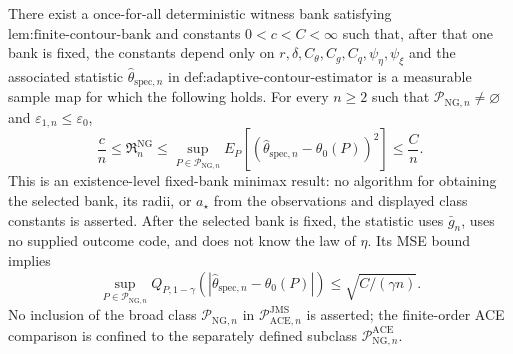 There exist a once-for-all deterministic witness bank satisfying \(\text{lem:finite-contour-bank}\) and constants \(0<c<C<\infty\) such that, after that one bank is fixed, the constants depend only on \(r,\delta,C_{\theta},C_g,C_q,\psi_{\eta},\psi_{\xi}\) and the associated statistic \(\widehat\theta_{\mathrm{spec},n}\) in \(\text{def:adaptive-contour-estimator}\) is a measurable sample map for which the following holds.  For every \(n\ge2\) such that \(\mathcal P_{\mathrm{NG},n}\neq\varnothing\) and \(\varepsilon_{1,n}\le\varepsilon_0\),
\[
 \frac cn\le\mathfrak R_n^{\mathrm{NG}}
 \le\sup_{P\in\mathcal P_{\mathrm{NG},n}}
 E_P[(\widehat\theta_{\mathrm{spec},n}-\theta_0(P))^2]
 \le\frac Cn.
\]
This is an existence-level fixed-bank minimax result: no algorithm for obtaining the selected bank, its radii, or \(a_{\star}\) from the observations and displayed class constants is asserted.  After the selected bank is fixed, the statistic uses \(\bar g_n\), uses no supplied outcome code, and does not know the law of \(\eta\).  Its MSE bound implies
\[
 \sup_{P\in\mathcal P_{\mathrm{NG},n}}
 Q_{P,1-\gamma}(|\widehat\theta_{\mathrm{spec},n}-\theta_0(P)|)
 \le\sqrt{C/(\gamma n)}.
\]
No inclusion of the broad class \(\mathcal P_{\mathrm{NG},n}\) in \(\mathcal P_{\mathrm{ACE},n}^{\mathrm{JMS}}\) is asserted; the finite-order ACE comparison is confined to the separately defined subclass \(\mathcal P_{\mathrm{NG},n}^{\mathrm{ACE}}\).